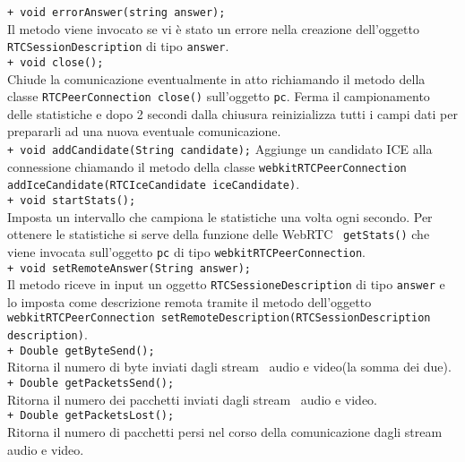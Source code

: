 {{\begin{sloppypar}
{{\begin{itemize}
{					\texttt{+ void errorAnswer(string answer);}\\
					Il metodo viene invocato se vi è stato un errore nella creazione dell'oggetto \texttt{RTCSessionDescription} di tipo \texttt{answer}.\\
					
					\texttt{+ void close();}\\
					Chiude la comunicazione eventualmente in atto richiamando il metodo della classe \texttt{RTCPeerConnection close()} sull'oggetto \texttt{pc}. Ferma il campionamento delle statistiche e dopo 2 secondi dalla chiusura reinizializza tutti i campi dati per prepararli ad una nuova eventuale comunicazione.\\

					\texttt{+ void addCandidate(String candidate);}
					Aggiunge un candidato ICE alla connessione chiamando il metodo della classe \texttt{webkitRTCPeerConnection addIceCandidate(RTCIceCandidate iceCandidate)}.\\
					
					\texttt{+ void startStats();}\\
					Imposta un intervallo che campiona le statistiche una volta ogni secondo. Per ottenere le statistiche si serve della funzione delle WebRTC\g~ \texttt{getStats()} che viene invocata sull'oggetto \texttt{pc} di tipo \texttt{webkitRTCPeerConnection}.\\
					
					\texttt{+ void setRemoteAnswer(String answer);}\\
					Il metodo riceve in input un oggetto \texttt{RTCSessioneDescription} di tipo \texttt{answer} e lo imposta come descrizione remota tramite il metodo dell'oggetto \texttt{webkitRTCPeerConnection setRemoteDescription(RTCSessionDescription description)}.\\
					
					\texttt{+ Double getByteSend();}\\
					Ritorna il numero di byte inviati dagli stream\g~ audio e video(la somma dei due).\\

					\texttt{+ Double getPacketsSend();}\\
					Ritorna il numero dei pacchetti inviati dagli stream\g~ audio e video.\\

					\texttt{+ Double getPacketsLost();}\\
					Ritorna il numero di pacchetti persi nel corso della comunicazione dagli stream\g~ audio e video.\\

}
\end{itemize}}}
\end{sloppypar}}}
